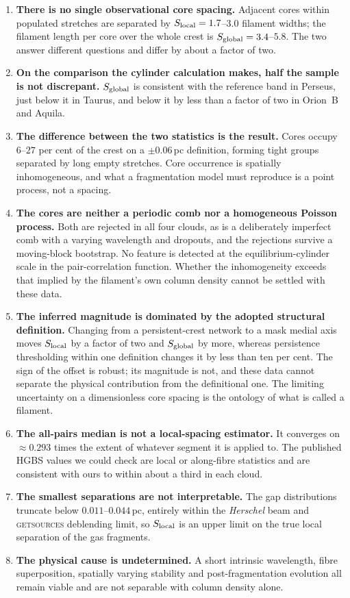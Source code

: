 \documentclass[usenatbib,twoside,twocolumn]{mnras}
\begin{document}
\begin{enumerate}\setlength{\itemsep}{2pt}
\item \textbf{There is no single observational core spacing.} Adjacent cores within populated stretches are separated by $S_{\rm local}=1.7$--$3.0$ filament widths; the filament length per core over the whole crest is $S_{\rm global}=3.4$--$5.8$. The two answer different questions and differ by about a factor of two.
\item \textbf{On the comparison the cylinder calculation makes, half the sample is not discrepant.} $S_{\rm global}$ is consistent with the reference band in Perseus, just below it in Taurus, and below it by less than a factor of two in Orion~B and Aquila.
\item \textbf{The difference between the two statistics is the result.} Cores occupy $6$--$27$ per cent of the crest on a $\pm0.06$\,pc definition, forming tight groups separated by long empty stretches. Core occurrence is spatially inhomogeneous, and what a fragmentation model must reproduce is a point process, not a spacing.
\item \textbf{The cores are neither a periodic comb nor a homogeneous Poisson process.} Both are rejected in all four clouds, as is a deliberately imperfect comb with a varying wavelength and dropouts, and the rejections survive a moving-block bootstrap. No feature is detected at the equilibrium-cylinder scale in the pair-correlation function. Whether the inhomogeneity exceeds that implied by the filament's own column density cannot be settled with these data.
\item \textbf{The inferred magnitude is dominated by the adopted structural definition.} Changing from a persistent-crest network to a mask medial axis moves $S_{\rm local}$ by a factor of two and $S_{\rm global}$ by more, whereas persistence thresholding within one definition changes it by less than ten per cent. The sign of the offset is robust; its magnitude is not, and these data cannot separate the physical contribution from the definitional one. The limiting uncertainty on a dimensionless core spacing is the ontology of what is called a filament.
\item \textbf{The all-pairs median is not a local-spacing estimator.} It converges on $\approx0.293$ times the extent of whatever segment it is applied to. The published HGBS values we could check are local or along-fibre statistics and are consistent with ours to within about a third in each cloud.
\item \textbf{The smallest separations are not interpretable.} The gap distributions truncate below $0.011$--$0.044$\,pc, entirely within the \textit{Herschel} beam and \textsc{getsources} deblending limit, so $S_{\rm local}$ is an upper limit on the true local separation of the gas fragments.
\item \textbf{The physical cause is undetermined.} A short intrinsic wavelength, fibre superposition, spatially varying stability and post-fragmentation evolution all remain viable and are not separable with column density alone.
\end{enumerate}
\end{document}
